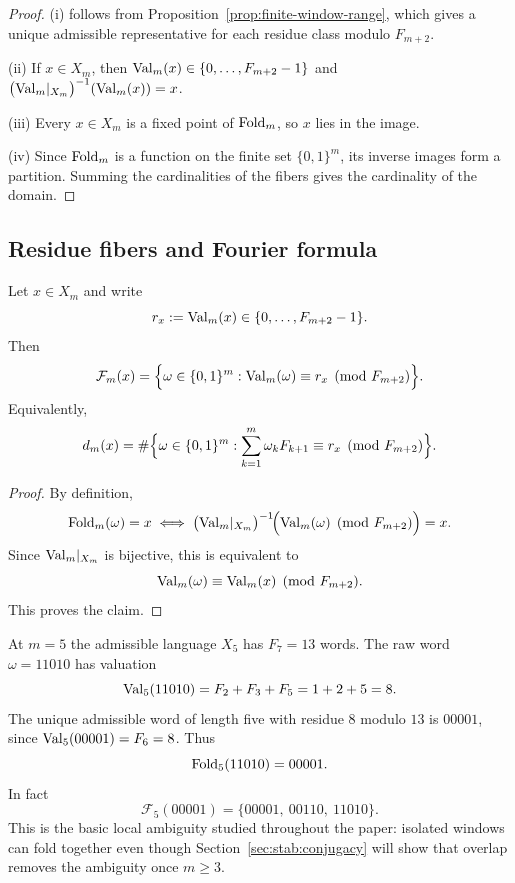 \begin{proof}
(i) follows from Proposition~\ref{prop:finite-window-range}, which gives a unique admissible representative for each residue class modulo $F_{m+2}$.

(ii) If $x\in X_m$, then $\mathrm{Val}_m(x)\in\{0,\dots,F_{m+2}-1\}$ and $\bigl(\mathrm{Val}_m|_{X_m}\bigr)^{-1}(\mathrm{Val}_m(x))=x$.

(iii) Every $x\in X_m$ is a fixed point of $\mathrm{Fold}_m$, so $x$ lies in the image.

(iv) Since $\mathrm{Fold}_m$ is a function on the finite set $\{0,1\}^m$, its inverse images form a partition. Summing the cardinalities of the fibers gives the cardinality of the domain.
\end{proof}

\subsection{Residue fibers and Fourier formula}\label{sec:stab:fiber}

\begin{theorem}\label{thm:fiber-residue}
Let $x\in X_m$ and write
\[
r_x:=\mathrm{Val}_m(x)\in\{0,\dots,F_{m+2}-1\}.
\]
Then
\[
\mathcal{F}_m(x)
=
\Bigl\{\omega\in\{0,1\}^m:
\mathrm{Val}_m(\omega)\equiv r_x \pmod{F_{m+2}}
\Bigr\}.
\]
Equivalently,
\[
d_m(x)
=
\#\Bigl\{\omega\in\{0,1\}^m:
\sum_{k=1}^m \omega_k F_{k+1}\equiv r_x \pmod{F_{m+2}}
\Bigr\}.
\]
\end{theorem}

\begin{proof}
By definition,
\[
\mathrm{Fold}_m(\omega)=x
\iff
\bigl(\mathrm{Val}_m|_{X_m}\bigr)^{-1}\!\Bigl(\mathrm{Val}_m(\omega)\pmod{F_{m+2}}\Bigr)=x.
\]
Since $\mathrm{Val}_m|_{X_m}$ is bijective, this is equivalent to
\[
\mathrm{Val}_m(\omega)\equiv \mathrm{Val}_m(x)\pmod{F_{m+2}}.
\]
This proves the claim.
\end{proof}

\begin{remark}[Worked example at $m=5$]
At $m=5$ the admissible language $X_5$ has $F_7=13$ words. The raw word $\omega=11010$ has valuation
\[
\mathrm{Val}_5(11010)=F_2+F_3+F_5=1+2+5=8.
\]
The unique admissible word of length five with residue $8$ modulo $13$ is $00001$, since $\mathrm{Val}_5(00001)=F_6=8$. Thus
\[
\mathrm{Fold}_5(11010)=00001.
\]
In fact
\[
\mathcal F_5(00001)=\{00001,\ 00110,\ 11010\}.
\]
This is the basic local ambiguity studied throughout the paper: isolated windows can fold together even though Section~\ref{sec:stab:conjugacy} will show that overlap removes the ambiguity once $m\ge 3$.
\end{remark}

